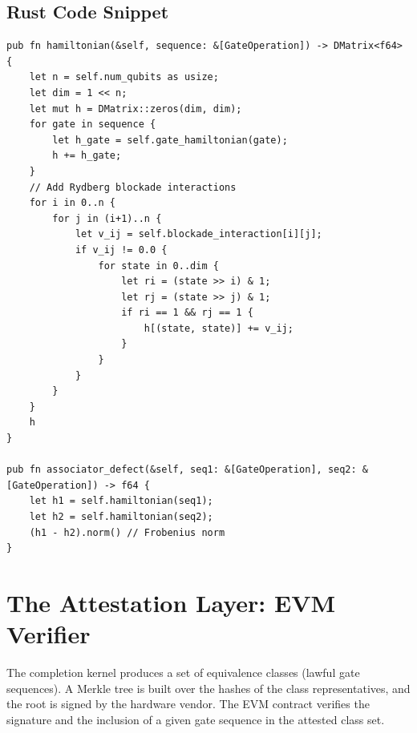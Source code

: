\documentclass[11pt]{article}
\begin{document}
\subsection{Rust Code Snippet}
\begin{lstlisting}[style=rust, caption={Hamiltonian evaluator and associator defect}]
pub fn hamiltonian(&self, sequence: &[GateOperation]) -> DMatrix<f64> {
    let n = self.num_qubits as usize;
    let dim = 1 << n;
    let mut h = DMatrix::zeros(dim, dim);
    for gate in sequence {
        let h_gate = self.gate_hamiltonian(gate);
        h += h_gate;
    }
    // Add Rydberg blockade interactions
    for i in 0..n {
        for j in (i+1)..n {
            let v_ij = self.blockade_interaction[i][j];
            if v_ij != 0.0 {
                for state in 0..dim {
                    let ri = (state >> i) & 1;
                    let rj = (state >> j) & 1;
                    if ri == 1 && rj == 1 {
                        h[(state, state)] += v_ij;
                    }
                }
            }
        }
    }
    h
}

pub fn associator_defect(&self, seq1: &[GateOperation], seq2: &[GateOperation]) -> f64 {
    let h1 = self.hamiltonian(seq1);
    let h2 = self.hamiltonian(seq2);
    (h1 - h2).norm() // Frobenius norm
}
\end{lstlisting}

\section{The Attestation Layer: EVM Verifier}

The completion kernel produces a set of equivalence classes (lawful gate sequences). A Merkle tree is built over the hashes of the class representatives, and the root is signed by the hardware vendor. The EVM contract verifies the signature and the inclusion of a given gate sequence in the attested class set.
\end{document}
